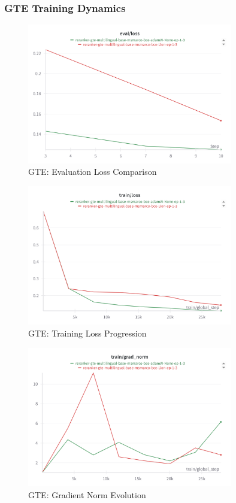 \subsubsection{GTE Training Dynamics}

\begin{figure}[H]
    \centering
    \includegraphics[width=0.8\textwidth]{Figures/gte_adamW_v_lion_eval_loss.png}
    \caption{GTE: Evaluation Loss Comparison}
    \label{fig:gte_eval_loss}
\end{figure}

\begin{figure}[H]
    \centering
    \includegraphics[width=0.8\textwidth]{Figures/gte_adamW_v_lion_train_loss.png}
    \caption{GTE: Training Loss Progression}
    \label{fig:gte_train_loss}
\end{figure}

\begin{figure}[H]
    \centering
    \includegraphics[width=0.8\textwidth]{Figures/gte_adamW_v_lion_grad_norm.png}
    \caption{GTE: Gradient Norm Evolution}
    \label{fig:gte_grad_norm}
\end{figure}

